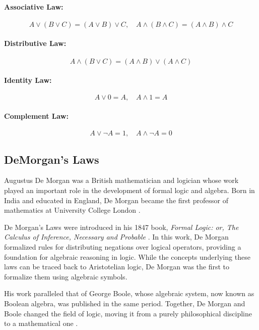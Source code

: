 \paragraph{Associative Law:} 
\[
A \lor (B \lor C) = (A \lor B) \lor C, \quad A \land (B \land C) = (A \land B) \land C
\]

\paragraph{Distributive Law:} 
\[
A \land (B \lor C) = (A \land B) \lor (A \land C)
\]

\paragraph{Identity Law:} 
\[
A \lor 0 = A, \quad A \land 1 = A
\]

\paragraph{Complement Law:} 
\[
A \lor \neg A = 1, \quad A \land \neg A = 0
\]

\subsection{DeMorgan's Laws}
Augustus De Morgan  was a British mathematician and logician whose work played an important role in the development of formal logic and algebra. Born in India and educated in England, De Morgan became the first professor of mathematics at University College London \cite{grattan1997}. 

De Morgan's Laws were introduced in his 1847 book, \emph{Formal Logic: or, The Calculus of Inference, Necessary and Probable} \cite{deMorgan1847}. In this work, De Morgan formalized rules for distributing negations over logical operators, providing a foundation for algebraic reasoning in logic. While the concepts underlying these laws can be traced back to Aristotelian logic, De Morgan was the first to formalize them using algebraic symbols.

His work paralleled that of George Boole, whose algebraic system, now known as Boolean algebra, was published in the same period. Together, De Morgan and Boole changed the field of logic, moving it from a purely philosophical discipline to a mathematical one \cite{grattan1997}.

